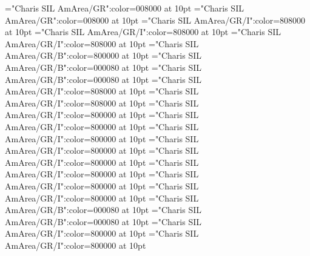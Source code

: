 \documentclass[a4paper,twoside]{article}
\begin{document}
\font\spanesdefinitionsensesensecontentsensesmainentrycomplex="Charis SIL AmArea/GR":color=008000 at 10pt
\font\spandefinitionsensesensecontentsensesmainentrycomplex="Charis SIL AmArea/GR":color=008000 at 10pt
\font\comentariorestrictivosensesensecontentsensesmainentrycomplex="Charis SIL AmArea/GR/I":color=808000 at 10pt
\font{}="Charis SIL AmArea/GR/I":color=808000 at 10pt
\font\scientificnamesensesensecontentsensesmainentrycomplex="Charis SIL AmArea/GR/I":color=808000 at 10pt
\font\sensenumbersensecontentsensessensesensecontentsensesmainentrycomplex="Charis SIL AmArea/GR/B":color=800000 at 10pt
\font\spanmxbexampleexamplescontentssensesensecontentsensesmainentrycomplex="Charis SIL AmArea/GR/B":color=000080 at 10pt
\font\spanexampleexamplescontentssensesensecontentsensesmainentrycomplex="Charis SIL AmArea/GR/B":color=000080 at 10pt
\font\spanesencyclopedicinfosensesensecontentsensesmainentrycomplex="Charis SIL AmArea/GR/I":color=808000 at 10pt
\font\spanencyclopedicinfosensesensecontentsensesmainentrycomplex="Charis SIL AmArea/GR/I":color=808000 at 10pt
\font\spanesreverseabbrcomplexformtypescomplexformentryrefsmainentrycomplex="Charis SIL AmArea/GR/I":color=800000 at 10pt
\font\spanreverseabbrcomplexformtypescomplexformentryrefsmainentrycomplex="Charis SIL AmArea/GR/I":color=800000 at 10pt
\font\spanmxbheadwordreferencedentryreferencedentriescomplexformentryrefsmainentrycomplex="Charis SIL AmArea/GR/I":color=800000 at 10pt
\font\spanheadwordreferencedentryreferencedentriescomplexformentryrefsmainentrycomplex="Charis SIL AmArea/GR/I":color=800000 at 10pt
\font\spanescommentmainentrycomplex="Charis SIL AmArea/GR/I":color=800000 at 10pt
\font\spancommentmainentrycomplex="Charis SIL AmArea/GR/I":color=800000 at 10pt
\font\spanesabbreviationvariantentrytypevariantentrytypesvariantformentrybackrefsmainentrycomplex="Charis SIL AmArea/GR/I":color=800000 at 10pt
\font\spanabbreviationvariantentrytypevariantentrytypesvariantformentrybackrefsmainentrycomplex="Charis SIL AmArea/GR/I":color=800000 at 10pt
\font\spanmxbheadwordvariantformentrybackrefvariantformentrybackrefsmainentrycomplex="Charis SIL AmArea/GR/B":color=000080 at 10pt
\font\spanheadwordvariantformentrybackrefvariantformentrybackrefsmainentrycomplex="Charis SIL AmArea/GR/B":color=000080 at 10pt
\font\spanesabbreviationvariantentrytypevariantentrytypesvariantformentrybackrefsbmainentrycomplex="Charis SIL AmArea/GR/I":color=800000 at 10pt
\font\spanabbreviationvariantentrytypevariantentrytypesvariantformentrybackrefsbmainentrycomplex="Charis SIL AmArea/GR/I":color=800000 at 10pt
\end{document}
